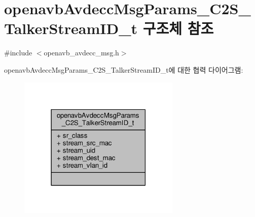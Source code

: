 \hypertarget{structopenavb_avdecc_msg_params___c2_s___talker_stream_i_d__t}{}\section{openavb\+Avdecc\+Msg\+Params\+\_\+\+C2\+S\+\_\+\+Talker\+Stream\+I\+D\+\_\+t 구조체 참조}
\label{structopenavb_avdecc_msg_params___c2_s___talker_stream_i_d__t}


{\ttfamily \#include $<$openavb\+\_\+avdecc\+\_\+msg.\+h$>$}



openavb\+Avdecc\+Msg\+Params\+\_\+\+C2\+S\+\_\+\+Talker\+Stream\+I\+D\+\_\+t에 대한 협력 다이어그램\+:
\nopagebreak
\begin{figure}[H]
\begin{center}
\leavevmode
\includegraphics[width=219pt]{structopenavb_avdecc_msg_params___c2_s___talker_stream_i_d__t__coll__graph}
\end{center}
\end{figure}
